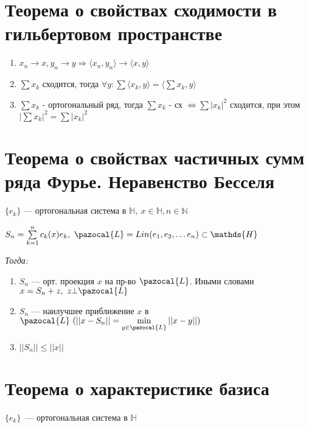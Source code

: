 \documentclass[paper=a4, fontsize=14pt]{article}
\begin{document}
\section{Теорема о свойствах сходимости в гильбертовом пространстве}
\begin{enumerate}
\item $x_n \rightarrow x, y_n \rightarrow y \Rightarrow \langle x_n, y_n \rangle \rightarrow \langle x, y \rangle$

\item $\sum x_k$ сходится, тогда $\forall y: \sum \langle x_k, y \rangle = \langle \sum x_k, y \rangle$

\item $\sum x_k$ - ортогональный ряд, тогда $\sum x_k$ - сх $\Leftrightarrow \sum |x_k|^2$ сходится, при этом $|\sum x_k|^2 = \sum |x_k|^2$

\end{enumerate}

\section{Теорема о свойствах частичных сумм ряда Фурье. Неравенство Бесселя}

$\{e_k\}$ {{---}} ортогональная система в $\mathds{H},\ x \in \mathds{H}, n \in \mathbb{N}$

$S_n = \sum\limits_{k=1}^{n} c_k(x)e_k,\ \pazocal{L} = Lin(e_1, e_2, \ldots e_n) \subset \mathds{H}$

\emph{Тогда:}

\begin{enumerate}

\item $S_n$ {{---}} орт. проекция $x$ на пр-во $\pazocal{L}$. Иными словами $x = S_n + z,\ z \bot \pazocal{L}$

\item $S_n$ {{---}} наилучшее приближение $x$ в $\pazocal{L}\ (||x - S_n|| = \min\limits_{y \in \pazocal{L}} ||x - y||)$

\item $||S_n|| \leqslant ||x||$

\end{enumerate}

\section{Теорема о характеристике базиса}

$\{e_k\}$~--- ортогональная система в $\mathds{H}$\\
\end{document}
